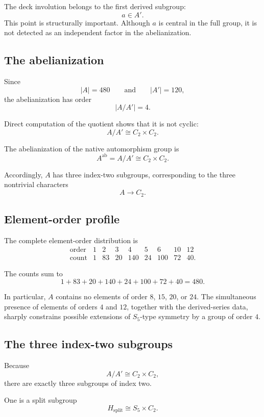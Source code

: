 The deck involution belongs to the first derived subgroup:
\[
a\in A'.
\]
This point is structurally important. Although $a$ is central in the
full group, it is not detected as an independent factor in the
abelianization.

\subsection{The abelianization}

Since
\[
|A|=480
\qquad\text{and}\qquad
|A'|=120,
\]
the abelianization has order
\[
|A/A'|=4.
\]

Direct computation of the quotient shows that it is not cyclic:
\[
A/A'\cong C_2\times C_2.
\]

\begin{corollary}
\label{cor:abelianization}
The abelianization of the native automorphism group is
\[
A^{\mathrm{ab}}
=
A/A'
\cong C_2\times C_2.
\]
\end{corollary}

Accordingly, $A$ has three index-two subgroups, corresponding to the
three nontrivial characters
\[
A\longrightarrow C_2.
\]

\subsection{Element-order profile}

The complete element-order distribution is
\[
\begin{array}{c|rrrrrrrr}
\text{order}
&1&2&3&4&5&6&10&12\\
\hline
\text{count}
&1&83&20&140&24&100&72&40.
\end{array}
\]

The counts sum to
\[
1+83+20+140+24+100+72+40=480.
\]

In particular, $A$ contains no elements of order $8$, $15$, $20$, or
$24$. The simultaneous presence of elements of orders $4$ and $12$,
together with the derived-series data, sharply constrains possible
extensions of $S_5$-type symmetry by a group of order $4$.

\subsection{The three index-two subgroups}

Because
\[
A/A'\cong C_2\times C_2,
\]
there are exactly three subgroups of index two.

One is a split subgroup
\[
H_{\mathrm{split}}\cong S_5\times C_2.
\]

